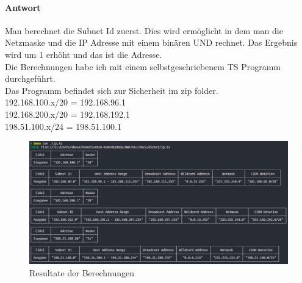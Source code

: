 \paragraph{Antwort}
Man berechnet die Subnet Id zuerst. Dies wird ermöglicht in dem man die Netzmaske und die IP Adresse mit einem binären UND rechnet. Das Ergebnis wird um 1 erhöht und das ist die Adresse.\\
Die Berechnungen habe ich mit einem selbstgeschriebenem TS Programm durchgeführt.\\
Das Programm befindet sich zur Sicherheit im zip folder.\\
192.168.100.x/20 = 192.168.96.1 \\
192.168.200.x/20 = 192.168.192.1 \\
198.51.100.x/24 = 198.51.100.1
\begin{figure}[!htb]
    \centering
    \includegraphics[width=\textwidth]{./img/config/frage1.png}
    \caption{Resultate der Berechnungen}
\end{figure}
\pagebreak

